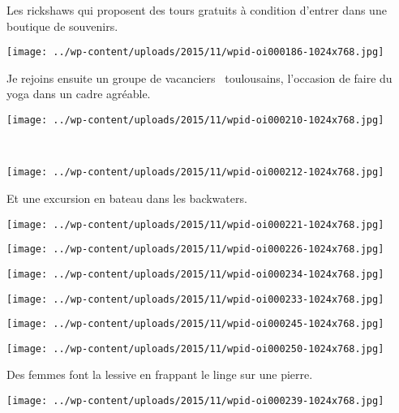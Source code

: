  Les rickshaws qui proposent des tours gratuits à condition d'entrer dans une boutique de souvenirs. 
\begin{center} \texttt{[image: ../wp-content/uploads/2015/11/wpid-oi000186-1024x768.jpg]} \end{center}

 Je rejoins ensuite un groupe de \og vacanciers \fg\ toulousains, l'occasion de faire du yoga dans un cadre agréable. 
\begin{center} \texttt{[image: ../wp-content/uploads/2015/11/wpid-oi000210-1024x768.jpg]} \end{center}
\vspace{-\topsep}
\pagebreak

 ~\\
\begin{center} \texttt{[image: ../wp-content/uploads/2015/11/wpid-oi000212-1024x768.jpg]} \end{center}

 Et une excursion en bateau dans les backwaters. \\
\begin{center} \texttt{[image: ../wp-content/uploads/2015/11/wpid-oi000221-1024x768.jpg]} \end{center}
\begin{center} \texttt{[image: ../wp-content/uploads/2015/11/wpid-oi000226-1024x768.jpg]} \end{center}
\begin{center} \texttt{[image: ../wp-content/uploads/2015/11/wpid-oi000234-1024x768.jpg]} \end{center}
\begin{center} \texttt{[image: ../wp-content/uploads/2015/11/wpid-oi000233-1024x768.jpg]} \end{center}
\begin{center} \texttt{[image: ../wp-content/uploads/2015/11/wpid-oi000245-1024x768.jpg]} \end{center}
\begin{center} \texttt{[image: ../wp-content/uploads/2015/11/wpid-oi000250-1024x768.jpg]} \end{center}

 Des femmes font la lessive en frappant le linge sur une pierre. 
\begin{center} \texttt{[image: ../wp-content/uploads/2015/11/wpid-oi000239-1024x768.jpg]} \end{center}
~\\~\\

